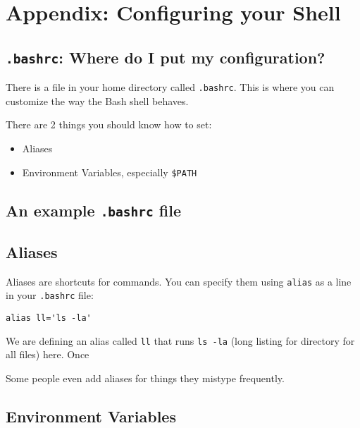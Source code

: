 \documentclass[
  letterpaper,
  DIV=11,
  numbers=noendperiod]{scrreprt}
\providecommand{\tightlist}{%
  \setlength{\itemsep}{0pt}\setlength{\parskip}{0pt}}
\begin{document}

\chapter{Appendix: Configuring your
Shell}\label{appendix-configuring-your-shell}

\section{\texorpdfstring{\texttt{.bashrc}: Where do I put my
configuration?}{.bashrc: Where do I put my configuration?}}\label{sec-bashrc}

There is a file in your home directory called \texttt{.bashrc}. This is
where you can customize the way the Bash shell behaves.

There are 2 things you should know how to set:

\begin{itemize}
\tightlist
\item
  Aliases
\item
  Environment Variables, especially \texttt{\$PATH}
\end{itemize}

\section{\texorpdfstring{An example \texttt{.bashrc}
file}{An example .bashrc file}}\label{an-example-.bashrc-file}

\section{Aliases}\label{aliases}

Aliases are shortcuts for commands. You can specify them using
\texttt{alias} as a line in your \texttt{.bashrc} file:

\begin{verbatim}
alias ll='ls -la'
\end{verbatim}

We are defining an alias called \texttt{ll} that runs \texttt{ls\ -la}
(long listing for directory for all files) here. Once

Some people even add aliases for things they mistype frequently.

\section{Environment Variables}\label{sec-environment}
\end{document}
